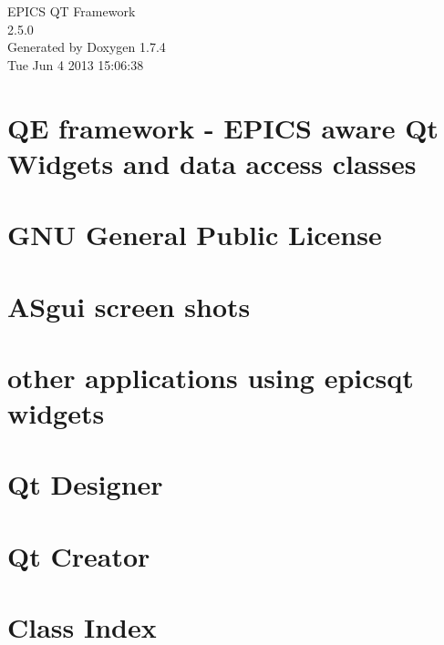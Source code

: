 \documentclass[a4paper]{book}
\begin{document}
\hypersetup{pageanchor=false}
\begin{titlepage}
\vspace*{7cm}
\begin{center}
{\Large EPICS QT Framework \\[1ex]\large 2.5.0 }\\
\vspace*{1cm}
{\large Generated by Doxygen 1.7.4}\\
\vspace*{0.5cm}
{\small Tue Jun 4 2013 15:06:38}\\
\end{center}
\end{titlepage}
\clearemptydoublepage
{}
\tableofcontents
\clearemptydoublepage
{}
\hypersetup{pageanchor=true}
\chapter{QE framework -\/ EPICS aware Qt Widgets and data access classes}
\label{index}\hypertarget{index}{}
\chapter{GNU General Public License}
\label{epicsqtlicense}
\hypertarget{epicsqtlicense}{}

\chapter{ASgui screen shots}
\label{ASguiscreenshots}
\hypertarget{ASguiscreenshots}{}

\chapter{other applications using epicsqt widgets}
\label{otherappscreenshots}
\hypertarget{otherappscreenshots}{}

\chapter{Qt Designer}
\label{designerscreenshots}
\hypertarget{designerscreenshots}{}

\chapter{Qt Creator}
\label{qtcreatorscreenshots}
\hypertarget{qtcreatorscreenshots}{}

\chapter{Class Index}

\end{document}
